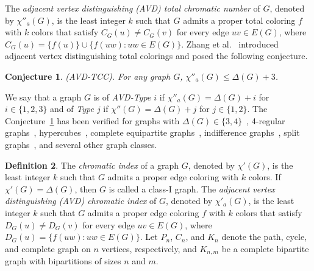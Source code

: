 \documentclass[12pt,reqno,a4paper]{amsart}
\theoremstyle{definition}
\newtheorem{defn}{Definition}[section]
\theoremstyle{plain}
\newtheorem{conjecture}[defn]{Conjecture}
\begin{document}
The {\em adjacent vertex distinguishing (AVD) total chromatic number}
of $G$, denoted by $\chi''_{a}(G)$, is the least integer $k$ such that $G$ admits a proper total coloring $f$ with $k$ colors that satisfy $C_G(u)\neq C_G(v)$ for every edge $uv\in E(G)$, where
$C_G(u)=\{f(u)\}\cup\{f(uw):uw\in E(G)\}$.
Zhang et al.~\cite{ZCYLW2005} introduced adjacent vertex distinguishing total colorings and posed the following conjecture.

\begin{conjecture}\label{Conjecture 1.2}(AVD-TCC). For any graph $G$, $\chi''_{a}(G) \leq \Delta(G) +3$.
\end{conjecture}

We say that a graph $G$ is of {\em AVD-Type $i$} if $\chi''_{a}(G) = \Delta(G) + i$ for $i\in\{1,2,3\}$ and of {\em Type $j$} if $\chi''(G) = \Delta(G) + j$ for $j\in\{1,2\}$. 
The Conjecture~\ref{Conjecture 1.2} has been verified for graphs with $\Delta(G)\in\{3,4\}$~\cite{Wang2007,Che2008,LLLM2017}, 4-regular graphs~\cite{PR2014}, hypercubes~\cite{CG2009}, complete equipartite graphs~\cite{LCM2015}, indifference graphs~\cite{PM2010}, split graphs~\cite{VFP2022}, and several other graph classes.

\begin{defn}\label{Definition 1.3}
The {\em chromatic index} of a graph $G$, denoted by $\chi'(G)$, is the least integer $k$ such that $G$ admits a proper edge coloring with $k$ colors.
If $\chi'(G)=\Delta(G)$, then $G$ is called a class-I graph.  
The {\em adjacent vertex distinguishing (AVD) chromatic index} of $G$, denoted by $\chi'_{a}(G)$, is the least integer $k$ such that $G$ admits a proper edge coloring $f$ with $k$ colors that satisfy $D_G(u)\neq D_G(v)$ for every edge $uv\in E(G)$, where
$D_G(u)=\{f(uw):uw\in E(G)\}$.
Let $P_n$, $C_n$, and $K_n$ denote the path, cycle, and complete graph on $n$ vertices, respectively, and $K_{n,m}$ be a complete bipartite graph with bipartitions of sizes $n$ and $m$. 
\end{defn}
\end{document}
